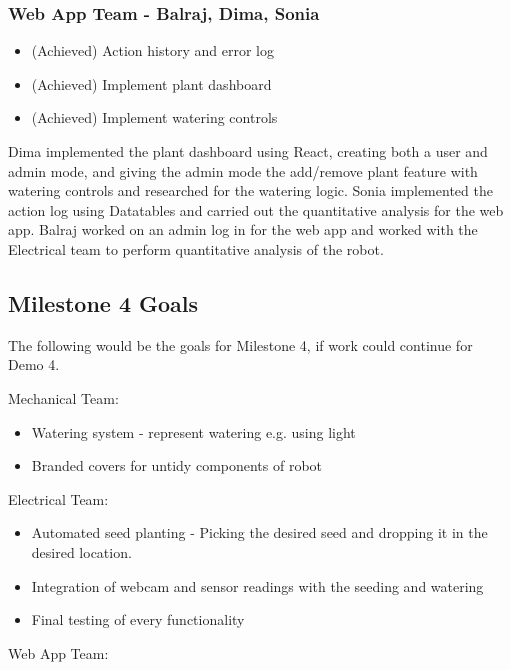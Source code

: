 \documentclass{article}
\begin{document}
\subsubsection{\textbf{Web App Team -  Balraj, Dima, Sonia}}
\vspace{1mm}
\begin{itemize}
    \setlength\itemsep{0.01em}
    \setlength\parskip{0pt}
    \item (Achieved) Action history and error log
    \item (Achieved) Implement plant dashboard
    \item (Achieved) Implement watering controls
\end{itemize}

Dima implemented the plant dashboard using React, creating both a user and admin mode, and giving the admin mode the add/remove plant feature with watering controls and researched for the watering logic. Sonia implemented the action log using Datatables and carried out the quantitative analysis for the web app. Balraj worked on an admin log in for the web app and worked with the Electrical team to perform quantitative analysis of the robot.

\subsection{Milestone 4 Goals}
The following would be the goals for Milestone 4, if work could continue for Demo 4.
\vspace{1mm}

Mechanical Team:
\vspace{-3mm}

\begin{itemize}
    \setlength\itemsep{0.01em}
    \setlength\parskip{0pt}
    \item Watering system - represent watering e.g.  using light
    \item Branded covers for untidy components of robot
\end{itemize}
Electrical Team:
\vspace{-3mm}
\begin{itemize}
    \setlength\itemsep{0.01em}
    \setlength\parskip{0pt}
    \item Automated seed planting - Picking the desired seed and dropping it in the desired location. 
    \item Integration of webcam and sensor readings with the seeding and watering \item Final testing of every functionality
\end{itemize}
Web App Team:
\vspace{-3mm}
\end{document}
